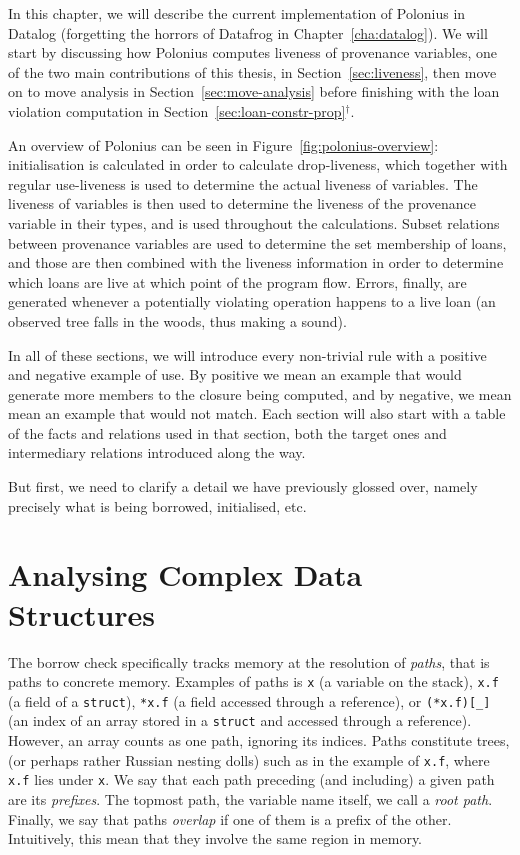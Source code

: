 \documentclass[11pt,a4paper,twoside,openany]{report}
\newcommand{\notmine}[0] {$^\dagger$}
\newcommand{\InRust}[1]{\texttt{#1}}
\begin{document}
In this chapter, we will describe the current implementation of Polonius in
Datalog (forgetting the horrors of Datafrog in Chapter~\ref{cha:datalog}). We
will start by discussing how Polonius computes liveness of provenance variables,
one of the two main contributions of this thesis, in Section~\ref{sec:liveness},
then move on to move analysis in Section~\ref{sec:move-analysis} before
finishing with the loan violation computation in
Section~\ref{sec:loan-constr-prop}\notmine{}.

An overview of Polonius can be seen in Figure~\ref{fig:polonius-overview}:
initialisation is calculated in order to calculate drop-liveness, which together
with regular use-liveness is used to determine the actual liveness of variables.
The liveness of variables is then used to determine the liveness of the
provenance variable in their types, and is used throughout the calculations.
Subset relations between provenance variables are used to determine the set
membership of loans, and those are then combined with the liveness information
in order to determine which loans are live at which point of the program flow.
Errors, finally, are generated whenever a potentially violating operation
happens to a live loan (an observed tree falls in the woods, thus making a
sound).

In all of these sections, we will introduce every non-trivial rule with a
positive and negative example of use. By positive we mean an example that would
generate more members to the closure being computed, and by negative, we mean
mean an example that would not match. Each section will also start with a table
of the facts and relations used in that section, both the target ones and
intermediary relations introduced along the way.

But first, we need to clarify a detail we have previously glossed over, namely
precisely what is being borrowed, initialised, etc.

\section{Analysing Complex Data Structures}\label{sec:paths}

The borrow check specifically tracks memory at the resolution of \textit{paths},
that is paths to concrete memory. Examples of paths is \InRust{x} (a variable on
the stack), \InRust{x.f} (a field of a \InRust{struct}), \InRust{*x.f} (a field
accessed through a reference), or \InRust{(*x.f)[_]} (an index of an array
stored in a \InRust{struct} and accessed through a reference). However, an array
counts as one path, ignoring its indices. Paths constitute trees, (or perhaps
rather Russian nesting dolls) such as in the example of \InRust{x.f}, where
\InRust{x.f} lies under \InRust{x}. We say that each path preceding (and
including) a given path are its \textit{prefixes}. The topmost path, the
variable name itself, we call a \textit{root path}. Finally, we say that paths
\textit{overlap} if one of them is a prefix of the other. Intuitively, this mean
that they involve the same region in memory.
\end{document}
